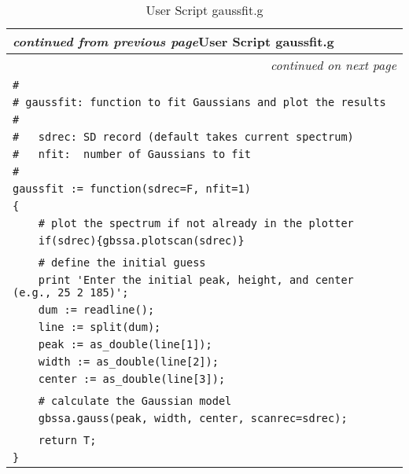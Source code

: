 \setlongtables
\begin{longtable}[c]{|l|}
\caption{User Script gaussfit.g}\label{gauss} \\
\cline{1-1}
\endfirsthead
\multicolumn{1}{l}{\hspace{9mm}\footnotesize{\slshape
 continued from previous page}\hfill{User Script gaussfit.g}} \\
\cline{1-1}
\endhead
\cline{1-1}
\multicolumn{1}{r}{\small \slshape
 continued on next page} \\
\endfoot
\cline{1-1}
\endlastfoot
{\slshape\small}
\verb|#| \\
\verb|# gaussfit: function to fit Gaussians and plot the results| \\
\verb|#   | \\
\verb|#   sdrec: SD record (default takes current spectrum)| \\
\verb|#   nfit:  number of Gaussians to fit| \\
\verb|#| \\
\verb|gaussfit := function(sdrec=F, nfit=1)| \\
\verb|{| \\
\verb|    # plot the spectrum if not already in the plotter| \\
\verb|    if(sdrec){gbssa.plotscan(sdrec)}| \\
\verb|| \\
\verb|    # define the initial guess| \\
\verb|    print 'Enter the initial peak, height, and center (e.g., 25 2 185)';| \\
\verb|    dum := readline();| \\
\verb|    line := split(dum);| \\
\verb|    peak := as_double(line[1]);| \\
\verb|    width := as_double(line[2]);| \\
\verb|    center := as_double(line[3]);| \\
\verb|| \\
\verb|    # calculate the Gaussian model| \\
\verb|    gbssa.gauss(peak, width, center, scanrec=sdrec);| \\
\verb|| \\
\verb|    return T;| \\
\verb|}| \\
\end{longtable}
